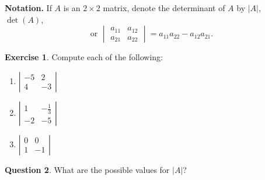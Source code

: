 \documentclass[handout]{beamer}
\newcommand{\fn}{\insertframenumber}
\theoremstyle{definition}
\newtheorem{exercise}{Exercise}
\newtheorem{question}[exercise]{Question}
\begin{document}
\begin{frame}{\fn}
	\begin{block}{\textbf{Notation.}}
		If $A$ is an $2\times 2$ matrix, denote the determinant of $A$ by $|A|$, $\det(A)$,\[\text{or } \begin{vmatrix}a_{11}&a_{12}\\a_{21}&a_{22}\end{vmatrix} = a_{11}a_{22}-a_{12}a_{21}.\]
	\end{block}
	\begin{exercise}
		Compute each of the following:
		\begin{multicols}{3}
			\begin{enumerate}[label=(\alph*)]
			\item $\left|\begin{array}{rr}
			-5 & 2 \\
			4 & -3
			\end{array}\right|$
			\item $\left|\begin{array}{rr}
			1 & -\frac{1}{3} \\
			-2 & -5
			\end{array}\right|$
			\item $\left|\begin{array}{rr}
			0 & 0 \\
			1 & -1
			\end{array}\right|$
		\end{enumerate}
		\end{multicols}
	\end{exercise}
	\begin{question}
		What are the possible values for $|A|$?
	\end{question}
\end{frame}
\end{document}
